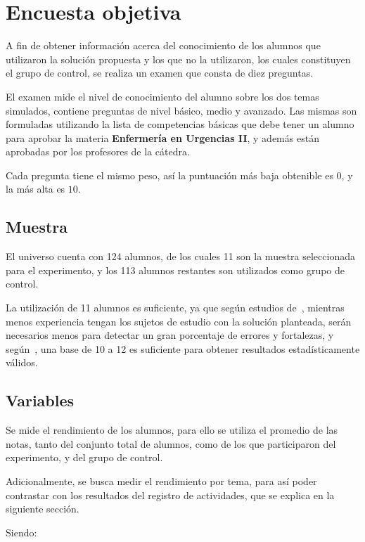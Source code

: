 \section{Encuesta objetiva}
\label{sec:objetiva}

A fin de obtener información acerca del conocimiento de los alumnos que
utilizaron la solución propuesta y los que no la utilizaron, los cuales
constituyen el grupo de control, se realiza un examen que consta de diez
preguntas.

El examen mide el nivel de conocimiento del alumno sobre los dos temas
simulados, contiene preguntas de nivel básico, medio y avanzado. Las mismas son
formuladas utilizando la lista de competencias básicas que debe tener un alumno
para aprobar la materia \textbf{Enfermería en Urgencias II}, y además están
aprobadas por los profesores de la cátedra.

Cada pregunta tiene el mismo peso, así la puntuación más baja obtenible es $0$, y
la más alta es $10$.

\subsection{Muestra}

El universo cuenta con 124 alumnos, de los cuales 11 son la muestra seleccionada
para el experimento, y los 113 alumnos restantes son utilizados como grupo de
control.

La utilización de 11 alumnos es suficiente, ya que según estudios
de~\cite{nielsen2000}, mientras menos experiencia tengan los sujetos de estudio
con la solución planteada, serán necesarios menos para detectar un gran
porcentaje de errores y fortalezas, y según~\cite{ritch2009}, una base de 10 a
12 es suficiente para obtener resultados estadísticamente válidos.

\subsection{Variables}

Se mide el rendimiento de los alumnos, para ello se utiliza el promedio de las
notas, tanto del conjunto total de alumnos, como de los que participaron del
experimento, y del grupo de control.

Adicionalmente, se busca medir el rendimiento por tema, para así poder
contrastar con los resultados del registro de actividades, que se explica en la
siguiente sección.

Siendo:

